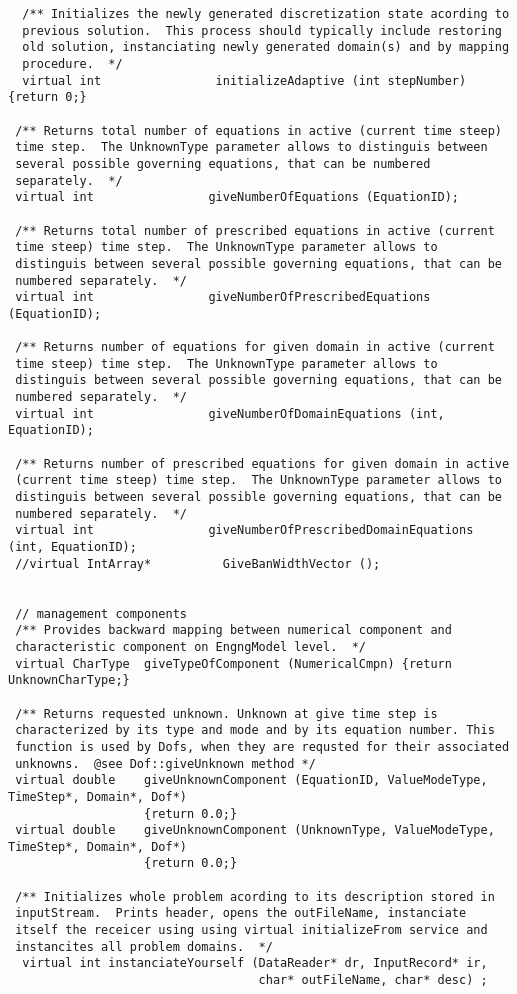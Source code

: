 \documentclass[12pt,draft]{article}
\begin{document}
{\begin{verbatim}
  /** Initializes the newly generated discretization state acording to
  previous solution.  This process should typically include restoring
  old solution, instanciating newly generated domain(s) and by mapping
  procedure.  */
  virtual int                initializeAdaptive (int stepNumber) {return 0;}

 /** Returns total number of equations in active (current time steep)
 time step.  The UnknownType parameter allows to distinguis between
 several possible governing equations, that can be numbered
 separately.  */
 virtual int                giveNumberOfEquations (EquationID);

 /** Returns total number of prescribed equations in active (current
 time steep) time step.  The UnknownType parameter allows to
 distinguis between several possible governing equations, that can be
 numbered separately.  */
 virtual int                giveNumberOfPrescribedEquations (EquationID);

 /** Returns number of equations for given domain in active (current
 time steep) time step.  The UnknownType parameter allows to
 distinguis between several possible governing equations, that can be
 numbered separately.  */
 virtual int                giveNumberOfDomainEquations (int, EquationID);

 /** Returns number of prescribed equations for given domain in active
 (current time steep) time step.  The UnknownType parameter allows to
 distinguis between several possible governing equations, that can be
 numbered separately.  */
 virtual int                giveNumberOfPrescribedDomainEquations (int, EquationID);
 //virtual IntArray*          GiveBanWidthVector ();
      

 // management components
 /** Provides backward mapping between numerical component and
 characteristic component on EngngModel level.  */
 virtual CharType  giveTypeOfComponent (NumericalCmpn) {return UnknownCharType;}

 /** Returns requested unknown. Unknown at give time step is
 characterized by its type and mode and by its equation number. This
 function is used by Dofs, when they are requsted for their associated
 unknowns.  @see Dof::giveUnknown method */
 virtual double    giveUnknownComponent (EquationID, ValueModeType, TimeStep*, Domain*, Dof*) 
                   {return 0.0;}
 virtual double    giveUnknownComponent (UnknownType, ValueModeType, TimeStep*, Domain*, Dof*) 
                   {return 0.0;}

 /** Initializes whole problem acording to its description stored in
 inputStream.  Prints header, opens the outFileName, instanciate
 itself the receicer using using virtual initializeFrom service and
 instancites all problem domains.  */
  virtual int instanciateYourself (DataReader* dr, InputRecord* ir, 
                                   char* outFileName, char* desc) ;


\end{verbatim}}
\end{document}
